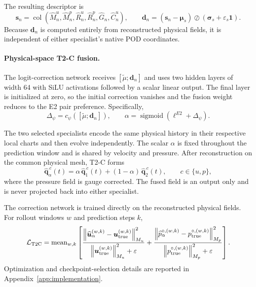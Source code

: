 The resulting descriptor is
\begin{equation}
  \bm s_n
  =
  \operatorname{col}
  \left(
    \widehat M_n^u,
    \widehat M_n^p,
    \widehat R_n^u,
    \widehat R_n^p,
    \widehat G_n,
    \widehat C_n^u
  \right),
  \qquad
  \bm d_n
  =
  (\bm s_n-\bm\mu_s)
  \oslash
  (\bm\sigma_s+\varepsilon_s\bm 1).
  \label{eq:app_t2c_descriptor}
\end{equation}
Because $\bm d_n$ is computed entirely from reconstructed physical fields,
it is independent of either specialist's native POD coordinates.


\paragraph{Physical-space T2-C fusion.}
The logit-correction network receives
$[\widetilde\mu;\bm d_n]$ and uses two hidden layers of width 64 with SiLU
activations followed by a scalar linear output.
The final layer is initialized at zero, so the initial correction vanishes
and the fusion weight reduces to the E2 pair preference.
Specifically,
\begin{equation}
  \Delta_\psi
  =
  c_\psi
  \left(
    [\widetilde\mu;\bm d_n]
  \right),
  \qquad
  \alpha
  =
  \operatorname{sigmoid}
  \left(
    \ell^{E2}+\Delta_\psi
  \right).
  \label{eq:app_t2c_gate}
\end{equation}

The two selected specialists encode the same physical history in their
respective local charts and then evolve independently.
The scalar $\alpha$ is fixed throughout the prediction window and is shared
by velocity and pressure.
After reconstruction on the common physical mesh, T2-C forms
\begin{equation}
  \widehat{\bm q}_{\alpha}^{\,c}(t)
  =
  \alpha\,
  \widehat{\bm q}_{1}^{\,c}(t)
  +
  (1-\alpha)\,
  \widehat{\bm q}_{2}^{\,c}(t),
  \qquad
  c\in\{u,p\},
  \label{eq:app_t2c_field_fusion}
\end{equation}
where the pressure field is gauge corrected.
The fused field is an output only and is never projected back into either
specialist.

The correction network is trained directly on the reconstructed physical
fields. For rollout windows $w$ and prediction steps $k$,
\begin{equation}
  \mathcal L_{\rm T2C}
  =
  \operatorname{mean}_{w,k}
  \left[
    \frac{
      \left\|
        \widehat{\bm u}_{\alpha}^{(w,k)}
        -
        \bm u_{\rm true}^{(w,k)}
      \right\|_{M_u}^2
    }{
      \left\|
        \bm u_{\rm true}^{(w,k)}
      \right\|_{M_u}^2+\varepsilon
    }
    +
    \frac{
      \left\|
        \widehat p_{\alpha}^{\circ,(w,k)}
        -
        p_{\rm true}^{\circ,(w,k)}
      \right\|_{M_p}^2
    }{
      \left\|
        p_{\rm true}^{\circ,(w,k)}
      \right\|_{M_p}^2+\varepsilon
    }
  \right].
  \label{eq:app_t2c_loss}
\end{equation}
Optimization and checkpoint-selection details are reported in
Appendix~\ref{app:implementation}.

